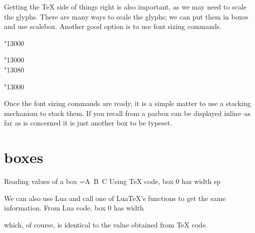 Getting the TeX side of things right is also important, as we may need to scale the glyphs. There are many ways to scale the glyphs; we can put them in boxes and use scalebox. Another good option is to use font sizing commands.

\begin{center}

{\hiero\fontsize{2cm}{0.5em}\selectfont \char"13000}
{\hiero\fontsize{1cm}{0.25em}\selectfont 
\parbox[b]{1cm}{\hiero\char"13000\\ \char"13080}
}
{
\hiero\fontsize{0.66cm}{0.5em}\selectfont 
{}
\hiero\fontsize{2cm}{0.5em}\selectfont \char"13000
}



\end{center}

Once the font sizing commands are ready, it is a simple matter to use a stacking mechanism to stack them. If you recall from a parbox can be displayed inline--as far as \tex is concerned it is just another box to be typeset.  

\section{boxes}

\begin{texexample}{Reading values of a box}{}
\bgroup
{}=\hbox{A\hskip 5pt B\hskip 10pt C}
\noindent Using \TeX{} code, box 0 has width \number{}\relax \space sp\par
\noindent We can also use Lua and call one of Lua\TeX's functions to get the same
information.\vskip10mm
\noindent From Lua code, box 0 has width 

 which, of course, is identical to the value obtained from \TeX{} code.

\egroup
\end{texexample}




